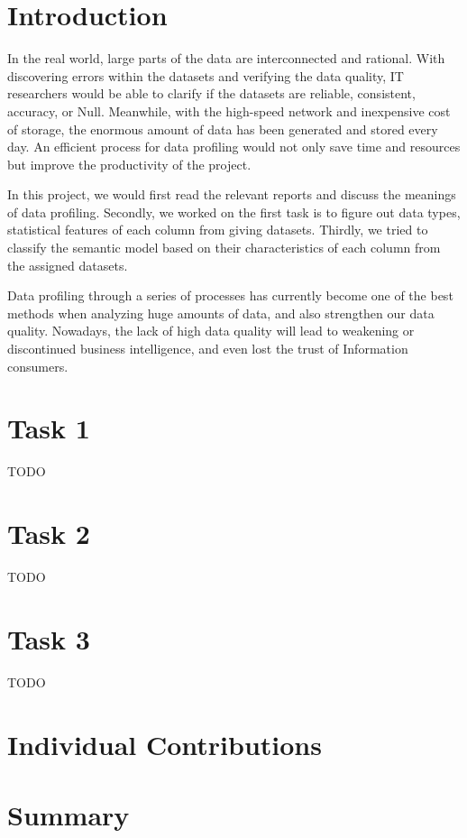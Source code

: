 \documentclass[sigconf]{acmart}
\begin{document}

\maketitle

\section{Introduction}
In the real world, large parts of the data are interconnected and rational. With discovering errors within the datasets and verifying the data quality, IT researchers would be able to clarify if the datasets are reliable, consistent, accuracy, or Null. 
Meanwhile, with the high-speed network and inexpensive cost of storage, the enormous amount of data has been generated and stored every day. An efficient process for data profiling would not only save time and resources but improve the productivity of the project. 

In this project, we would first read the relevant reports and discuss the meanings of data profiling. Secondly, we worked on the first task is to figure out data types, statistical features of each column from giving datasets. Thirdly, we tried to classify the semantic model based on their characteristics of each column from the assigned datasets.

Data profiling through a series of processes has currently become one of the best methods when analyzing huge amounts of data, and also strengthen our data quality. Nowadays, the lack of high data quality will lead to weakening or discontinued business intelligence, and even lost the trust of Information consumers.

\section{Task 1}

TODO

\section{Task 2}

TODO

\section{Task 3}

TODO

\section{Individual Contributions}

\section{Summary}
\end{document}
